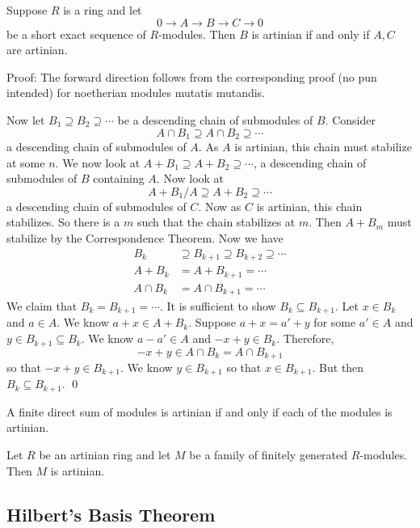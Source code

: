 \begin{thm}
Suppose $R$ is a ring and let
\[
0 \longrightarrow A \longrightarrow B \longrightarrow C \longrightarrow 0
\]
be a short exact sequence of $R$-modules. Then $B$ is artinian if and only if $A,C$ are artinian.
\end{thm}

Proof: The forward direction follows from the corresponding proof (no pun intended) for noetherian modules mutatis mutandis. 

Now let $B_1 \supseteq B_2 \supseteq \cdots$ be a descending chain of submodules of $B$. Consider
\[
A \cap B_1 \supseteq A \cap B_2 \supseteq \cdots
\]
a descending chain of submodules of $A$. As $A$ is artinian, this chain must stabilize at some $n$. We now look at $A+B_1 \supseteq A+B_2 \supseteq \cdots$, a descending chain of submodules of $B$ containing $A$. Now look at
\[
A+B_1/A \supseteq A+B_2 \supseteq \cdots
\]
a descending chain of submodules of $C$. Now as $C$ is artinian, this chain stabilizes. So there is a $m$ such that the chain stabilizes at $m$. Then $A+B_m$ must stabilize by the Correspondence Theorem. Now we have
\[
\begin{split}
B_k &\supseteq B_{k+1} \supseteq B_{k+2} \supseteq \cdots \\
A+B_k&=A+B_{k+1}=\cdots \\
A\cap B_k&=A \cap B_{k+1}=\cdots
\end{split}
\]
We claim that $B_k=B_{k+1}=\cdots$. It is sufficient to show $B_k \subseteq B_{k+1}$. Let $x \in B_k$ and $a \in A$. We know $a+x \in A+B_k$. Suppose $a+x=a'+y$ for some $a' \in A$ and $y \in B_{k+1} \subseteq B_k$. We know $a-a' \in A$ and $-x+y \in B_k$. Therefore,
\[
-x+y \in A \cap B_k= A \cap B_{k+1}
\]
so that $-x+y \in B_{k+1}$. We know $y \in B_{k+1}$ so that $x \in B_{k+1}$. But then $B_k \subseteq B_{k+1}$. \qed \\

\begin{cor}
A finite direct sum of modules is artinian if and only if each of the modules is artinian.
\end{cor}

\begin{cor}
Let $R$ be an artinian ring and let $M$ be a family of finitely generated $R$-modules. Then $M$ is artinian. 
\end{cor}

\subsection{Hilbert's Basis Theorem}

